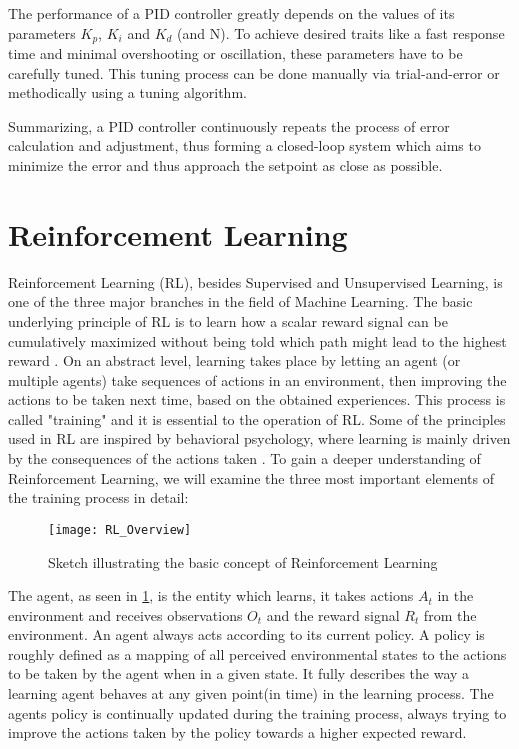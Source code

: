 The performance of a PID controller greatly depends on the values of its parameters $K_p$, $K_i$ and $K_d$ (and N).
To achieve desired traits like a fast response time and minimal overshooting or oscillation, these parameters have to be carefully tuned. 
This tuning process can be done manually via trial-and-error or methodically using a tuning algorithm.

Summarizing, a PID controller continuously repeats the process of error calculation and adjustment, thus forming a closed-loop system which aims to minimize the error and thus approach the setpoint as close as possible.



\section{Reinforcement Learning}

Reinforcement Learning (RL), besides Supervised and Unsupervised Learning, is one of the three major branches in the field of Machine Learning.
The basic underlying principle of RL is to learn how a scalar reward signal can be cumulatively maximized without being told which path might lead to the highest reward \parencite{sutton2018reinforcement}.
On an abstract level, learning takes place by letting an agent (or multiple agents) take sequences of actions in an environment, then improving the actions to be taken next time, based on the obtained experiences.
This process is called "training" and it is essential to the operation of RL.
Some of the principles used in RL are inspired by behavioral psychology, where learning is mainly driven by the consequences of the actions taken \parencite{sutton2018reinforcement, joshi2021reinforcement}.
To gain a deeper understanding of Reinforcement Learning, we will examine the three most important elements of the training process in detail:

\begin{figure}[h]
	\centerline{\texttt{[image: RL\_Overview]}}
	\caption{Sketch illustrating the basic concept of Reinforcement Learning}
	\label{figure: RL Illustration}
\end{figure}

The agent, as seen in \ref{figure: RL Illustration}, is the entity which learns, it takes actions $A_t$ in the environment and receives observations $O_t$ and the reward signal $R_t$ from the environment.
An agent always acts according to its current policy.
A policy is roughly defined as a mapping of all perceived environmental states to the actions to be taken by the agent when in a given state.
It fully  describes the way a learning agent behaves at any given point(in time) in the learning process.\parencite{sutton2018reinforcement} \parencite{silver2015}
The agents policy is continually updated during the training process, always trying to improve the actions taken by the policy towards a higher expected reward.

